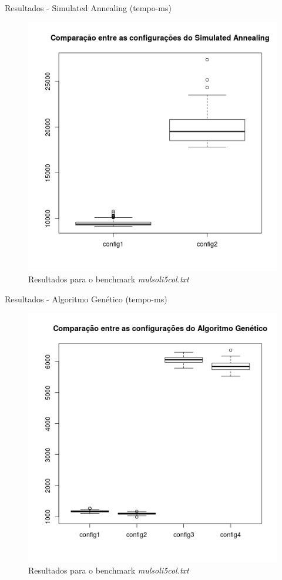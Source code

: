 \documentclass[compress, hide notes]{beamer}
\begin{document}
        
        \begin{frame}{Resultados - Simulated Annealing (tempo-ms)}
        
        	\begin{figure}[H]
			\centering
            \label{fig:tmp-sa-mulsoli5col}
            \includegraphics[width=0.6\linewidth]{img/sa-tmp-mulsoli5col.png}
            \caption[Resultados para o benchmark mulsoli5col.txt]{Resultados para o benchmark \textit{mulsoli5col.txt}}
			\end{figure}

		\end{frame}
        
        \begin{frame}{Resultados - Algoritmo Genético (tempo-ms)}
        
        	\begin{figure}[H]
			\centering
            \label{fig:tmp-ga-mulsoli5col}
            \includegraphics[width=0.6\linewidth]{img/ga-tmp-mulsoli5col.png}
            \caption[Resultados para o benchmark mulsoli5col.txt]{Resultados para o benchmark \textit{mulsoli5col.txt}}
			\end{figure}

		\end{frame}
        
\end{document}
